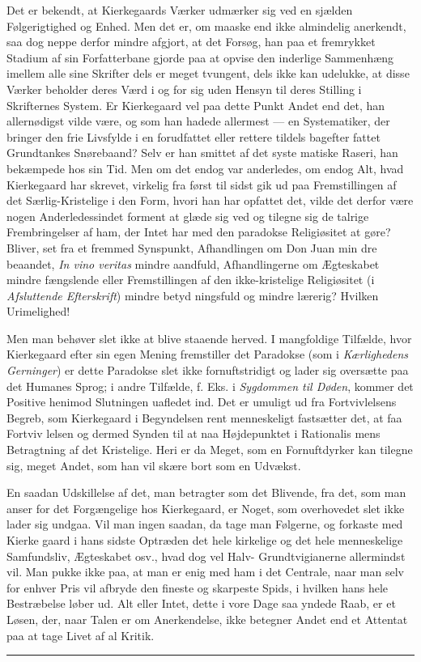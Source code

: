 \documentclass[12pt,a4paper,openany]{book}
\newcommand{\piecerule}{\par\begin{center}\rule{1.5cm}{0.4pt}\end{center}\par}
\newcommand{\opage}[1]{\marginnote{\footnotesize\textit{[#1]}}}
\begin{document}
Det er bekendt, at Kierkegaards Værker udmærker sig ved
en sjælden Følgerigtighed og Enhed. Men det er, om maaske
end ikke almindelig anerkendt, saa dog neppe derfor mindre
afgjort, at det Forsøg, han paa et fremrykket Stadium af sin
Forfatterbane gjorde paa at opvise den inderlige Sammenhæng
imellem alle sine Skrifter dels er meget tvungent, dels ikke kan
udelukke, at disse Værker beholder deres Værd i og for sig uden
Hensyn til deres Stilling i Skrifternes System. Er Kierkegaard
vel paa dette Punkt Andet end det, han allernødigst vilde være,
og som han hadede allermest --- en Systematiker, der bringer
den frie Livsfylde i en forudfattet eller rettere tildels bagefter
fattet Grundtankes Snørebaand? Selv er han smittet af det syste\-%
matiske Raseri, han bekæmpede hos sin Tid. Men om det
endog var anderledes, om endog Alt, hvad Kierkegaard har
skrevet, virkelig fra først til sidst gik ud paa Fremstillingen
af det Særlig-Kristelige i den Form, hvori han har opfattet
det, vilde det derfor være nogen Anderledessindet forment at
glæde sig ved og tilegne sig de talrige Frembringelser af ham,
der Intet har med den paradokse Religiøsitet at gøre? Bliver,
set fra et fremmed Synspunkt, Afhandlingen om Don Juan min\-%
dre beaandet, \emph{In vino veritas} mindre aandfuld, Afhandlingerne
om Ægteskabet mindre fængslende eller Fremstillingen af den
ikke-kristelige Religiøsitet (i \emph{Afsluttende Efterskrift}) mindre betyd\-%
ningsfuld og mindre lærerig? Hvilken Urimelighed!

Men man behøver slet ikke at blive staaende herved. I
mangfoldige Tilfælde, hvor Kierkegaard efter sin egen Mening
fremstiller det Paradokse (som i \emph{Kærlighedens Gerninger}) er dette
Paradokse slet ikke fornuftstridigt og lader sig oversætte paa
det Humanes Sprog; i andre Tilfælde, f. Eks. i \emph{Sygdommen
til Døden}, kommer det Positive henimod Slutningen uafledet ind.
Det er umuligt ud fra Fortvivlelsens Begreb, som Kierkegaard
i Begyndelsen rent menneskeligt fastsætter det, at faa Fortviv\-%
lelsen og dermed Synden til at naa Højdepunktet i Rationalis\-%
mens Betragtning af det Kristelige. Heri er da Meget, som en
\opage{101}Fornuftdyrker kan tilegne sig, meget Andet, som han vil skære
bort som en Udvækst.

En saadan Udskillelse af det, man betragter som det Blivende,
fra det, som man anser for det Forgængelige hos Kierkegaard,
er Noget, som overhovedet slet ikke lader sig undgaa. Vil man
ingen saadan, da tage man Følgerne, og forkaste med Kierke\-%
gaard i hans sidste Optræden det hele kirkelige og det hele
menneskelige Samfundsliv, Ægteskabet osv., hvad dog vel Halv-%
Grundtvigianerne allermindst vil. Man pukke ikke paa, at man
er enig med ham i det Centrale, naar man selv for enhver Pris
vil afbryde den fineste og skarpeste Spids, i hvilken hans hele
Bestræbelse løber ud. Alt eller Intet, dette i vore Dage saa
yndede Raab, er et Løsen, der, naar Talen er om Anerkendelse,
ikke betegner Andet end et Attentat paa at tage Livet af al
Kritik.
\piecerule
\end{document}
